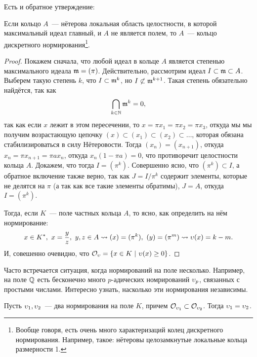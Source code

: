 	
	Есть и обратное утверждение: 
	\begin{statement}\label{ant_2_prop_1} 
		Если кольцо $A$~--- нётерова локальная область целостности, в которой максимальный идеал главный, и $A$ не является полем, то $A$~--- кольцо дискретного нормирования\footnote{Вообще говоря, есть очень много характеризаций колец дискретного нормирования. Например, такое: нётеровы целозамкнутые локальные кольца размерности 1. }. 	
	\end{statement}
	\begin{proof}
		Покажем сначала, что любой идеал в кольце $A$ является степенью максимального идеала $\mathfrak{m} = (\pi)$. Действительно, рассмотрим идеал $I \subset \mathfrak{m} \subset A$. Выберем такую степень $k$, что $I \subset \mathfrak{m}^{k}$, но $I \not\subset \mathfrak{m}^{k + 1}$. Такая степень обязательно найдётся, так как 
	\[
		\bigcap_{k \in \mathbb{N}} \mathfrak{m}^k = 0,
	\]
	так как если $x$ лежит в этом пересечении, то $x = \pi x_1 = \pi x_2 = \pi x_3$, откуда мы мы получим возрастающую цепочку $(x) \subset (x_1) \subset (x_2) \subset \ldots$, которая обязана стабилизироваться в силу Нётеровости. Тогда  $(x_n) = (x_{n + 1})$, откуда $ x_n = \pi x_{n + 1} = \pi a x_{n}$, откуда $x_n (1 - \pi a) = 0$, что противоречит целостности кольца $A$. Докажем, что тогда $I = (\pi^k)$. Совершенно ясно, что $(\pi^k) \subset I$,  а обратное включение также верно, так как $J = I/\pi^k$ содержит элементы, которые не делятся на $\pi$ (а так как все такие элементы обратимы), $J = A$, откуда $I = (\pi^k)$.

	Тогда, если $K$~--- поле частных кольца $A$, то ясно, как определить на нём нормирование: 
	\[
		x \in K^{*}, \ x = \frac{y}{z}, \ y, z \in A \rightsquigarrow (x) = (\pi^k), \ (y) = (\pi^m) \rightsquigarrow \upsilon(x) = k - m.
	\]
	И, совешенно очевидно, что $\mathcal{O}_{\upsilon} = \{ x \in K \ \vert \ \upsilon(x) \ge 0 \}$. 
	\end{proof}

	Часто встречается ситуация, когда нормирований на поле несколько. Например, на поле $\mathbb{Q}$ есть бесконечно много $p$-адических номрирований $\upsilon_{p}$, связанных с простыми числами. Интересно узнать, насколько эти нормирования независимы. 

	\begin{lemma}\label{ant_2_lemma_1} 
		Пусть $\upsilon_1, \upsilon_2$~--- два нормирования на поле $K$, причем $\mathcal{O}_{\upsilon_1} \subset \mathcal{O}_{\upsilon_2}$. Тогда $\upsilon_1 = \upsilon_2$.
	\end{lemma}

